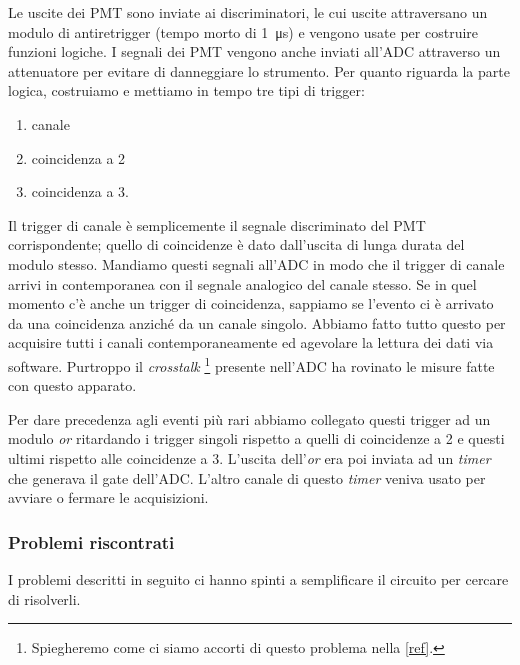 Le uscite dei PMT sono inviate ai discriminatori, le cui uscite attraversano un modulo di antiretrigger (tempo morto di \SI{1}{\micro s}) e vengono usate per costruire funzioni logiche. I segnali dei PMT vengono anche inviati all'ADC attraverso un attenuatore per evitare di danneggiare lo strumento.
Per quanto riguarda la parte logica, costruiamo e mettiamo in tempo tre tipi di trigger:
\begin{enumerate}
\item canale
\item coincidenza a 2
\item coincidenza a 3.
\end{enumerate}
Il trigger di canale è semplicemente il segnale discriminato del PMT corrispondente; quello di coincidenze è dato dall'uscita di lunga durata del modulo stesso. Mandiamo questi segnali all'ADC in modo che il trigger di canale arrivi in contemporanea con il segnale analogico del canale stesso. Se in quel momento c'è anche un trigger di coincidenza, sappiamo se l'evento ci è arrivato da una coincidenza anziché da un canale singolo. Abbiamo fatto tutto questo per acquisire tutti i canali contemporaneamente ed agevolare la lettura dei dati via software. Purtroppo il \emph{crosstalk}%
\footnote{Spiegheremo come ci siamo accorti di questo problema nella \autoref{ref}.} presente nell'ADC ha rovinato le misure fatte con questo apparato.


Per dare precedenza agli eventi più rari abbiamo collegato questi trigger ad un modulo \emph{or} ritardando i trigger singoli rispetto a quelli di coincidenze a 2 e questi ultimi rispetto alle coincidenze a 3. L'uscita dell'\emph{or} era poi inviata ad un \emph{timer} che generava il gate dell'ADC. L'altro canale di questo \emph{timer} veniva usato per avviare o fermare le acquisizioni.

\subsubsection{Problemi riscontrati}

I problemi descritti in seguito ci hanno spinti a semplificare il circuito per cercare di risolverli.

